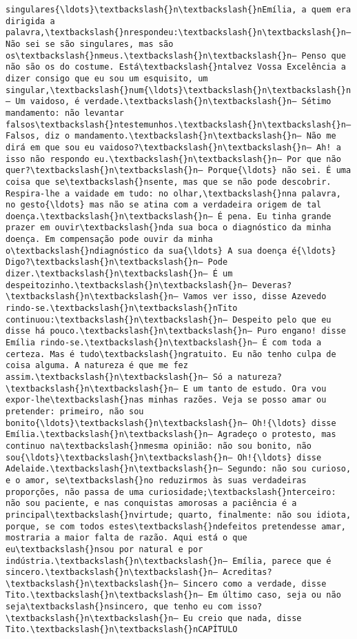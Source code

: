 \documentclass[11pt]{article}
\begin{document}
\begin{Verbatim}[commandchars=\\\{\}]
singulares{\ldots}\textbackslash{}n\textbackslash{}nEmília, a quem era dirigida a palavra,\textbackslash{}nrespondeu:\textbackslash{}n\textbackslash{}n— Não sei se são singulares, mas são os\textbackslash{}nmeus.\textbackslash{}n\textbackslash{}n— Penso que não são os do costume. Está\textbackslash{}ntalvez Vossa Excelência a dizer consigo que eu sou um esquisito, um singular,\textbackslash{}num{\ldots}\textbackslash{}n\textbackslash{}n— Um vaidoso, é verdade.\textbackslash{}n\textbackslash{}n— Sétimo mandamento: não levantar falsos\textbackslash{}ntestemunhos.\textbackslash{}n\textbackslash{}n— Falsos, diz o mandamento.\textbackslash{}n\textbackslash{}n— Não me dirá em que sou eu vaidoso?\textbackslash{}n\textbackslash{}n— Ah! a isso não respondo eu.\textbackslash{}n\textbackslash{}n— Por que não quer?\textbackslash{}n\textbackslash{}n— Porque{\ldots} não sei. É uma coisa que se\textbackslash{}nsente, mas que se não pode descobrir. Respira-lhe a vaidade em tudo: no olhar,\textbackslash{}nna palavra, no gesto{\ldots} mas não se atina com a verdadeira origem de tal doença.\textbackslash{}n\textbackslash{}n— É pena. Eu tinha grande prazer em ouvir\textbackslash{}nda sua boca o diagnóstico da minha doença. Em compensação pode ouvir da minha o\textbackslash{}ndiagnóstico da sua{\ldots} A sua doença é{\ldots} Digo?\textbackslash{}n\textbackslash{}n— Pode dizer.\textbackslash{}n\textbackslash{}n— É um despeitozinho.\textbackslash{}n\textbackslash{}n— Deveras?\textbackslash{}n\textbackslash{}n— Vamos ver isso, disse Azevedo rindo-se.\textbackslash{}n\textbackslash{}nTito continuou:\textbackslash{}n\textbackslash{}n— Despeito pelo que eu disse há pouco.\textbackslash{}n\textbackslash{}n— Puro engano! disse Emília rindo-se.\textbackslash{}n\textbackslash{}n— É com toda a certeza. Mas é tudo\textbackslash{}ngratuito. Eu não tenho culpa de coisa alguma. A natureza é que me fez assim.\textbackslash{}n\textbackslash{}n— Só a natureza?\textbackslash{}n\textbackslash{}n— E um tanto de estudo. Ora vou expor-lhe\textbackslash{}nas minhas razões. Veja se posso amar ou pretender: primeiro, não sou bonito{\ldots}\textbackslash{}n\textbackslash{}n— Oh!{\ldots} disse Emília.\textbackslash{}n\textbackslash{}n— Agradeço o protesto, mas continuo na\textbackslash{}nmesma opinião: não sou bonito, não sou{\ldots}\textbackslash{}n\textbackslash{}n— Oh!{\ldots} disse Adelaide.\textbackslash{}n\textbackslash{}n— Segundo: não sou curioso, e o amor, se\textbackslash{}no reduzirmos às suas verdadeiras proporções, não passa de uma curiosidade;\textbackslash{}nterceiro: não sou paciente, e nas conquistas amorosas a paciência é a principal\textbackslash{}nvirtude; quarto, finalmente: não sou idiota, porque, se com todos estes\textbackslash{}ndefeitos pretendesse amar, mostraria a maior falta de razão. Aqui está o que eu\textbackslash{}nsou por natural e por indústria.\textbackslash{}n\textbackslash{}n— Emília, parece que é sincero.\textbackslash{}n\textbackslash{}n— Acreditas?\textbackslash{}n\textbackslash{}n— Sincero como a verdade, disse Tito.\textbackslash{}n\textbackslash{}n— Em último caso, seja ou não seja\textbackslash{}nsincero, que tenho eu com isso?\textbackslash{}n\textbackslash{}n— Eu creio que nada, disse Tito.\textbackslash{}n\textbackslash{}nCAPÍTULO 
\end{Verbatim}
\end{document}
